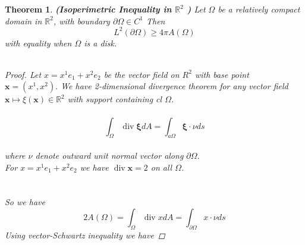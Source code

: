 \documentclass[oneside]{book}
\newtheorem{theorem}{Theorem}[section]
\begin{document}
\begin{theorem} \textbf{(Isoperimetric Inequality in $\mathbb{R}^{2}$ )} Let $\Omega$ be a relatively compact domain in $\mathbb{R}^{2}$, with boundary $\partial \Omega \in C^{1}$ Then
      \begin{equation}
   L^{2}(\partial \Omega) \geq 4 \pi A(\Omega) 
      \end{equation}
 with equality when $\Omega$ is a disk.\\\\

\begin{proof}

 Let $x=x^{1} e_{1}+x^{2} e_{2}$ be the vector field on $R^{2}$ with base point $\textbf{x}=\left(x^{1}, x^{2}\right) .$
We have 2-dimensional divergence theorem for any vector
field $\textbf{x} \mapsto \xi(\textbf{x}) \in \mathbb{R}^{2}$ with support containing cl $\Omega$.
\\\\
    \begin{equation}
\int_{\Omega} \operatorname{div} \boldsymbol{\xi} d A=\int_{a \Omega} \boldsymbol{\xi} \cdot \nu d s 
  \end{equation} \\
  
where $\nu$ denote outward unit normal vector along $\partial\Omega$. \\
    
For  $ x=x^{1} e_{1}+x^{2} e_{2}$ we have 
$\operatorname{div} \textbf{x}=2$ on all $\Omega$. 
\\\\\\
So we have
\\
$$ 2 A(\Omega)=\int_{\Omega} \operatorname{div} x d A=\int_{\partial \Omega} x \cdot \nu d s$$ 
Using vector-Schwartz inequality we have 


\end{proof}
\end{theorem}
\end{document}
